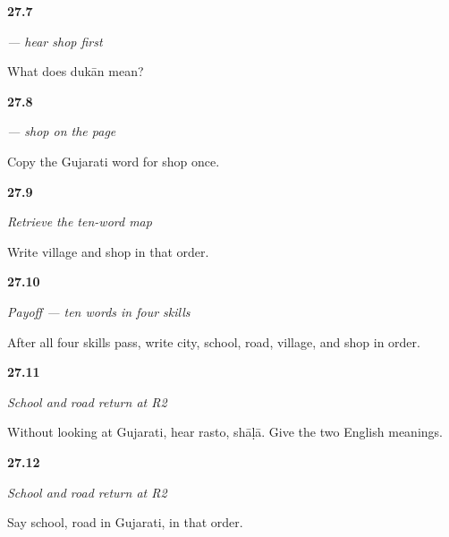 \noindent\begin{minipage}[t]{\linewidth}
\raggedright
\hypertarget{review-GU-C23-hear-dukaan-recall}{\textbf{27.7}} \emph{ — hear shop first}\par
\small What does dukān mean?
\end{minipage}\par\medskip

\noindent\begin{minipage}[t]{\linewidth}
\raggedright
\hypertarget{review-GU-C23-dukaan-copy}{\textbf{27.8}} \emph{ — shop on the page}\par
\small Copy the Gujarati word for shop once.
\end{minipage}\par\medskip

\noindent\begin{minipage}[t]{\linewidth}
\raggedright
\hypertarget{review-GU-R23-map-ten-recall}{\textbf{27.9}} \emph{Retrieve the ten-word map}\par
\small Write village and shop in that order.
\end{minipage}\par\medskip

\noindent\begin{minipage}[t]{\linewidth}
\raggedright
\hypertarget{review-GU-C23-map-ten-payoff}{\textbf{27.10}} \emph{Payoff — ten words in four skills}\par
\small After all four skills pass, write city, school, road, village, and shop in order.
\end{minipage}\par\medskip

\noindent\begin{minipage}[t]{\linewidth}
\raggedright
\hypertarget{review-GU-R23-shaalaa-rasto-r2-listening}{\textbf{27.11}} \emph{School and road return at R2}\par
\small Without looking at Gujarati, hear rasto, shāḷā. Give the two English meanings.
\end{minipage}\par\medskip

\noindent\begin{minipage}[t]{\linewidth}
\raggedright
\hypertarget{review-GU-R23-shaalaa-rasto-r2-speaking}{\textbf{27.12}} \emph{School and road return at R2}\par
\small Say school, road in Gujarati, in that order.
\end{minipage}\par\medskip

